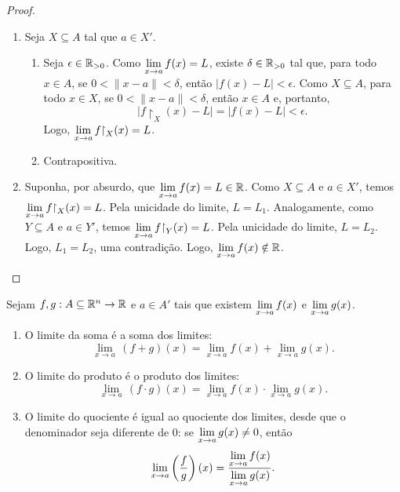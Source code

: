 \begin{proof}
    \leavevmode
        \begin{enumerate}[leftmargin=*, align=left, label=\textbf{(\alph*)}]
            \item Seja $X \subseteq A$ tal que $a \in X'$.
                \begin{enumerate}[label=\roman*.]
                    \item Seja $\epsilon \in \mathbb{R}_{>0}$. Como $\displaystyle \lim_{x \to a} f(x) = L$, existe $\delta \in \mathbb{R}_{>0}$ tal que, para todo $x \in A$, se $0<\|x-a\|<\delta$, então $|f(x)-L|<\epsilon$. Como $X \subseteq A$, para todo $x \in X$, se $0<\|x-a\|<\delta$, então $x \in A$ e, portanto,
                        \[
                            |f \restriction_X(x)-L| = |f(x)-L| < \epsilon.
                        \]
                    Logo, $\ds \lim_{x \to a} f \restriction_X(x) = L$. \blackproof
                    \item Contrapositiva. \blackproof
                \end{enumerate}
            \item Suponha, por absurdo, que $\displaystyle \lim_{x \to a} f(x) = L \in \mathbb{R}$. Como $X \subseteq A$ e $a \in X'$, temos $\ds \lim_{x \to a} f \restriction_X (x) = L$. Pela unicidade do limite, $L = L_1$. Analogamente, como $Y \subseteq A$ e $a \in Y'$, temos $\ds \lim_{x \to a} f \restriction_Y (x) = L$. Pela unicidade do limite, $L = L_2$. Logo, $L_1 = L_2$, uma contradição. Logo, $\displaystyle \lim_{x \to a} f(x) \notin \mathbb{R}$. \blackproof
        \end{enumerate}
\end{proof}

\begin{theorem} \label{teo.calc2:algebra_dos_limites}
    Sejam $f,g : A \subseteq \mathbb{R}^n \to \mathbb{R}$ e $a \in A'$ tais que existem $\displaystyle \lim_{x \to a} f(x)$ e $\displaystyle \lim_{x \to a} g(x)$.
        \begin{enumerate}[leftmargin=*, align=left, label=\textbf{(\alph*)}]
            \item O limite da soma é a soma dos limites:
                \[
                    \lim_{x \to a} \, (f+g)(x) = \lim_{x \to a} f(x) + \lim_{x \to a} g(x).
                \]
            \item O limite do produto é o produto dos limites:
                \[
                    \lim_{x \to a} \, (f \cdot g)(x) = \lim_{x \to a} f(x) \cdot \lim_{x \to a} g(x).
                \]
            \item O limite do quociente é igual ao quociente dos limites, desde que o denominador seja diferente de $0$: se $\displaystyle \lim_{x \to a} g(x) \neq 0$, então
                \[
                    \lim_{x \to a} \left(\dfrac{f}{g} \right)(x) = \dfrac{\displaystyle \lim_{x \to a} f(x)}{\displaystyle \lim_{x \to a} g(x)}.
                \]
        \end{enumerate}
\end{theorem}

